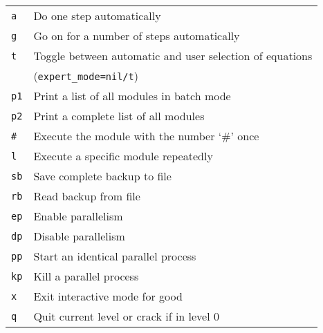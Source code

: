 \begin{longtable}[l]{ll}
  \texttt{a}  & Do one step automatically \\
  \texttt{g}  & Go on for a number of steps automatically \\
  \texttt{t}  & Toggle between automatic and user selection of equations \\
  & (\texttt{expert\_mode=nil/t}) \\
  \texttt{p1} & Print a list of all modules in batch mode \\
  \texttt{p2} & Print a complete list of all modules \\
  \texttt{\#} & Execute the module with the number `\#' once \\
  \texttt{l}  & Execute a specific module repeatedly \\
  \texttt{sb} & Save complete backup to file \\
  \texttt{rb} & Read backup from file \\
  \texttt{ep} & Enable parallelism \\
  \texttt{dp} & Disable parallelism \\
  \texttt{pp} & Start an identical parallel process \\
  \texttt{kp} & Kill a parallel process \\
  \texttt{x}  & Exit interactive mode for good \\
  \texttt{q}  & Quit current level or crack if in level 0
\end{longtable}


